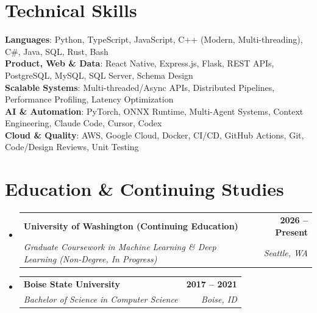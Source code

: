 \documentclass[letterpaper,11pt]{article}
\makeatletter
\newcommand{\resumeSubheading}[4]{
  \vspace{-2pt}\item
    \begin{tabular*}{1.0\textwidth}[t]{l@{\extracolsep{\fill}}r}
      \textbf{#1} & \textbf{\small #2} \\
      \textit{\small#3} & \textit{\small #4} \\
    \end{tabular*}\vspace{-7pt}
}
\newcommand{\resumeSubHeadingListStart}{\begin{itemize}[leftmargin=0.0in, label={}]}
\newcommand{\resumeSubHeadingListEnd}{\end{itemize}}
\makeatother
\begin{document}
\section{Technical Skills}
 \begin{itemize}[leftmargin=0.15in, label={}]
    \small{\item{
     \textbf{Languages}{: Python, TypeScript, JavaScript, C++ (Modern, Multi-threading), C\#, Java, SQL, Rust, Bash} \\
     \textbf{Product, Web \& Data}{: React Native, Express.js, Flask, REST APIs, PostgreSQL, MySQL, SQL Server, Schema Design} \\
     \textbf{Scalable Systems}{: Multi-threaded/Async APIs, Distributed Pipelines, Performance Profiling, Latency Optimization} \\
     \textbf{AI \& Automation}{: PyTorch, ONNX Runtime, Multi-Agent Systems, Context Engineering, Claude Code, Cursor, Codex} \\
     \textbf{Cloud \& Quality}{: AWS, Google Cloud, Docker, CI/CD, GitHub Actions, Git, Code/Design Reviews, Unit Testing}
    }}
 \end{itemize}
 \vspace{-12pt}

\section{Education \& Continuing Studies}
  \resumeSubHeadingListStart
    \resumeSubheading
      {University of Washington (Continuing Education)}{2026 -- Present}
      {Graduate Coursework in Machine Learning \& Deep Learning (Non-Degree, In Progress)}{Seattle, WA}
    \resumeSubheading
      {Boise State University}{2017 -- 2021}
      {Bachelor of Science in Computer Science}{Boise, ID}
  \resumeSubHeadingListEnd
\end{document}
